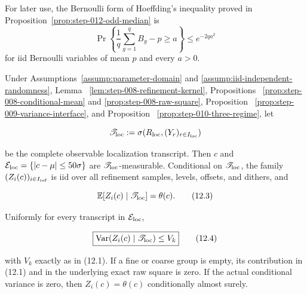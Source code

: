 For later use, the Bernoulli form of Hoeffding's inequality proved in
Proposition~\ref{prop:step-012-odd-median} is
\[
\Pr\left\{\frac1q\sum_{g=1}^qB_g-p\geq a\right\}
\leq e^{-2qa^2}
\tag{12.2}
\]
for iid Bernoulli variables of mean \(p\) and every \(a>0\).

\begin{lemma}\label{lem:step-012-transcript-kernel}
Under Assumptions~\ref{assump:parameter-domain} and
\ref{assump:iid-independent-randomness}, Lemma~
\ref{lem:step-008-refinement-kernel}, Propositions~
\ref{prop:step-008-conditional-mean} and
\ref{prop:step-008-raw-square}, Proposition~
\ref{prop:step-009-variance-interface}, and Proposition~
\ref{prop:step-010-three-regime}, let

\[
\mathscr T_{\rm loc}
:=\sigma\!\left(R_{\rm loc},(Y_r)_{r\in I_{\rm loc}}\right)
\]

be the complete observable localization transcript. Then \(c\) and
\(\mathcal E_{\rm loc}=\{|c-\mu|\leq50\sigma\}\) are
\(\mathscr T_{\rm loc}\)-measurable. Conditional on
\(\mathscr T_{\rm loc}\), the family
\((Z_i(c))_{i\in I_{\rm ref}}\) is iid over all refinement samples, levels,
offsets, and dithers, and

\[
\mathbb E[Z_i(c)\mid\mathscr T_{\rm loc}]=\theta(c).
\tag{12.3}
\]

Uniformly for every transcript in \(\mathcal E_{\rm loc}\),

\[
\boxed{
\operatorname{Var}(Z_i(c)\mid\mathscr T_{\rm loc})\leq V_k
}
\tag{12.4}
\]

with \(V_k\) exactly as in (12.1). If a fine or coarse group is empty, its
contribution in (12.1) and in the underlying exact raw square is zero. If the
actual conditional variance is zero, then
\(Z_i(c)=\theta(c)\) conditionally almost surely.
\end{lemma}

